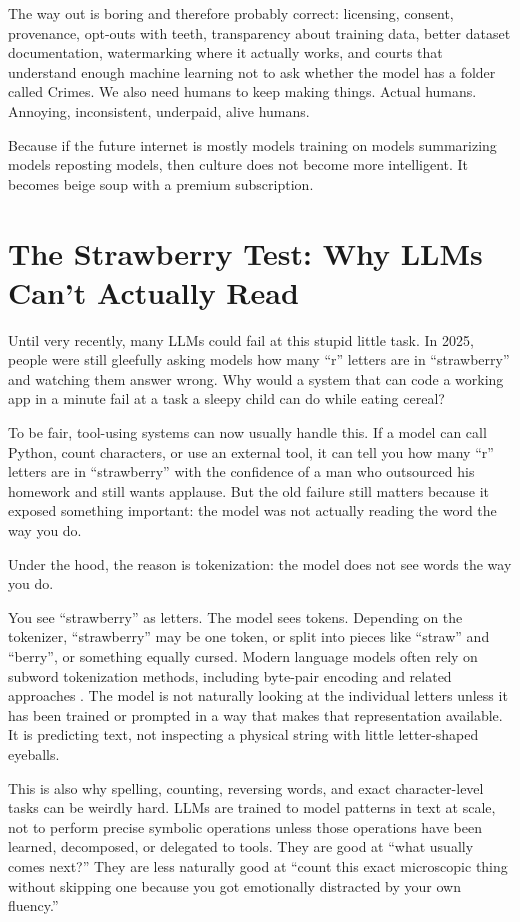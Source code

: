 \documentclass[12pt,oneside]{book}
\begin{document}
The way out is boring and therefore probably correct: licensing, consent, provenance, opt-outs with teeth, transparency about training data, better dataset documentation, watermarking where it actually works, and courts that understand enough machine learning not to ask whether the model has a folder called Crimes. We also need humans to keep making things. Actual humans. Annoying, inconsistent, underpaid, alive humans.

Because if the future internet is mostly models training on models summarizing models reposting models, then culture does not become more intelligent. It becomes beige soup with a premium subscription.

\chapter{The Strawberry Test: Why LLMs Can't Actually Read}

Until very recently, many LLMs could fail at this stupid little task. In 2025, people were still gleefully asking models how many ``r'' letters are in ``strawberry'' and watching them answer wrong. Why would a system that can code a working app in a minute fail at a task a sleepy child can do while eating cereal?

To be fair, tool-using systems can now usually handle this. If a model can call Python, count characters, or use an external tool, it can tell you how many ``r'' letters are in ``strawberry'' with the confidence of a man who outsourced his homework and still wants applause. But the old failure still matters because it exposed something important: the model was not actually reading the word the way you do.

Under the hood, the reason is tokenization: the model does not see words the way you do.

You see ``strawberry'' as letters. The model sees tokens. Depending on the tokenizer, ``strawberry'' may be one token, or split into pieces like ``straw'' and ``berry'', or something equally cursed. Modern language models often rely on subword tokenization methods, including byte-pair encoding and related approaches \parencite{sennrich2016}. The model is not naturally looking at the individual letters unless it has been trained or prompted in a way that makes that representation available. It is predicting text, not inspecting a physical string with little letter-shaped eyeballs.

This is also why spelling, counting, reversing words, and exact character-level tasks can be weirdly hard. LLMs are trained to model patterns in text at scale, not to perform precise symbolic operations unless those operations have been learned, decomposed, or delegated to tools. They are good at ``what usually comes next?'' They are less naturally good at ``count this exact microscopic thing without skipping one because you got emotionally distracted by your own fluency.''
\end{document}

